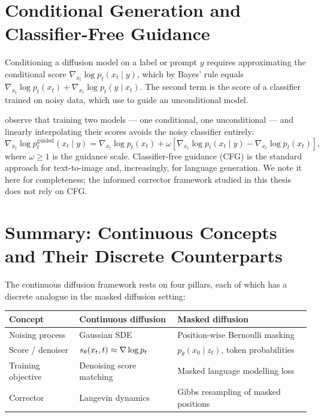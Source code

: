 \section{Conditional Generation and Classifier-Free Guidance}
\label{sec:cfg}

Conditioning a diffusion model on a label or prompt $y$ requires approximating the
conditional score $\nabla_{x_t}\log p_t(x_t \mid y)$, which by Bayes' rule equals
$\nabla_{x_t}\log p_t(x_t) + \nabla_{x_t}\log p_t(y \mid x_t)$. The second term is the
score of a classifier trained on noisy data, which \textcite{dhariwal2021diffusionbeats}
use to guide an unconditional model.

\textcite{ho2022cfg} observe that training two models --- one conditional, one
unconditional --- and linearly interpolating their scores avoids the noisy classifier
entirely:
\begin{equation}
  \nabla_{x_t}\log p_t^{\mathrm{guided}}(x_t \mid y)
  = \nabla_{x_t}\log p_t(x_t)
    + \omega\!\left[\nabla_{x_t}\log p_t(x_t \mid y)
                  - \nabla_{x_t}\log p_t(x_t)\right],
  \label{eq:cfg}
\end{equation}
where $\omega \geq 1$ is the guidance scale. Classifier-free guidance (CFG) is the
standard approach for text-to-image and, increasingly, for language generation.
We note it here for completeness; the informed corrector framework studied in this thesis
does not rely on CFG.

\section{Summary: Continuous Concepts and Their Discrete Counterparts}
\label{sec:ch2-summary}

The continuous diffusion framework rests on four pillars, each of which has a discrete
analogue in the masked diffusion setting:

\begin{center}
\begin{tabular}{@{}lll@{}}
  \toprule
  Concept & Continuous diffusion & Masked diffusion \\
  \midrule
  Noising process & Gaussian SDE & Position-wise Bernoulli masking \\
  Score / denoiser & $s_\theta(x_t,t) \approx \nabla \log p_t$ &
    $p_\theta(x_0 \mid z_t)$, token probabilities \\
  Training objective & Denoising score matching & Masked language modelling loss \\
  Corrector & Langevin dynamics & Gibbs resampling of masked positions \\
  \bottomrule
\end{tabular}
\end{center}

